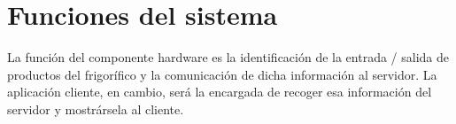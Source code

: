 \section{Funciones del sistema}

La función del componente hardware es la identificación de la entrada / salida de productos del frigorífico y la comunicación de dicha información al servidor. La aplicación cliente, en cambio, será la encargada de recoger esa información del servidor y mostrársela al cliente.